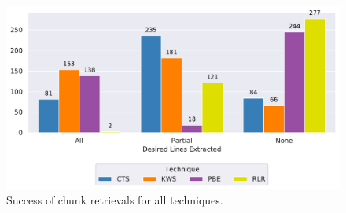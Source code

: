 \begin{figure}[!t]
		\centering
		\includegraphics[width=\columnwidth,
		clip]{img/big-study/success-partial-all.pdf}
		\caption{Success of chunk retrievals for all techniques.}
		\label{fig:success-partial-all}
\end{figure}

